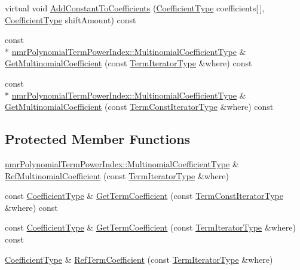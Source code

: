 \begin{DoxyCompactItemize}
\item 
virtual void \hyperlink{classnmr_bernstein_polynomial_a02c6714afc14c2138054e6b27ab8375b}{Add\-Constant\-To\-Coefficients} (\hyperlink{classnmr_polynomial_base_a8693efdfc8585ccb49abea69f74f3eef}{Coefficient\-Type} coefficients\mbox{[}$\,$\mbox{]}, \hyperlink{classnmr_polynomial_base_a8693efdfc8585ccb49abea69f74f3eef}{Coefficient\-Type} shift\-Amount) const 
\item 
const \\*
\hyperlink{classnmr_polynomial_term_power_index_a09f482da776cfb829e26ad1fb381ab94}{nmr\-Polynomial\-Term\-Power\-Index\-::\-Multinomial\-Coefficient\-Type} \& \hyperlink{classnmr_bernstein_polynomial_a934b948b27ef035ef62aa43c635ae784}{Get\-Multinomial\-Coefficient} (const \hyperlink{classnmr_polynomial_container_a276e57445d038e8a16462f47b85719a3}{Term\-Iterator\-Type} \&where) const 
\item 
const \\*
\hyperlink{classnmr_polynomial_term_power_index_a09f482da776cfb829e26ad1fb381ab94}{nmr\-Polynomial\-Term\-Power\-Index\-::\-Multinomial\-Coefficient\-Type} \& \hyperlink{classnmr_bernstein_polynomial_a30b33638e9343cec80cea704f364dde2}{Get\-Multinomial\-Coefficient} (const \hyperlink{classnmr_polynomial_container_aba8d31506ab6a487fdc4fe2815469442}{Term\-Const\-Iterator\-Type} \&where) const 
\end{DoxyCompactItemize}
\subsection*{Protected Member Functions}
\begin{DoxyCompactItemize}
\item 
\hyperlink{classnmr_polynomial_term_power_index_a09f482da776cfb829e26ad1fb381ab94}{nmr\-Polynomial\-Term\-Power\-Index\-::\-Multinomial\-Coefficient\-Type} \& \hyperlink{classnmr_bernstein_polynomial_ab72225000d4462b8ce1c941a29245268}{Ref\-Multinomial\-Coefficient} (const \hyperlink{classnmr_polynomial_container_a276e57445d038e8a16462f47b85719a3}{Term\-Iterator\-Type} \&where)
\item 
const \hyperlink{classnmr_polynomial_base_a8693efdfc8585ccb49abea69f74f3eef}{Coefficient\-Type} \& \hyperlink{classnmr_bernstein_polynomial_ad19aadc8aee129cc1201f638f9340c28}{Get\-Term\-Coefficient} (const \hyperlink{classnmr_polynomial_container_aba8d31506ab6a487fdc4fe2815469442}{Term\-Const\-Iterator\-Type} \&where) const 
\item 
const \hyperlink{classnmr_polynomial_base_a8693efdfc8585ccb49abea69f74f3eef}{Coefficient\-Type} \& \hyperlink{classnmr_bernstein_polynomial_a15e4932f2013e9157706fce26d34d5d0}{Get\-Term\-Coefficient} (const \hyperlink{classnmr_polynomial_container_a276e57445d038e8a16462f47b85719a3}{Term\-Iterator\-Type} \&where) const 
\item 
\hyperlink{classnmr_polynomial_base_a8693efdfc8585ccb49abea69f74f3eef}{Coefficient\-Type} \& \hyperlink{classnmr_bernstein_polynomial_a991fafd8dcb73e118ad9f7a046bc59a5}{Ref\-Term\-Coefficient} (const \hyperlink{classnmr_polynomial_container_a276e57445d038e8a16462f47b85719a3}{Term\-Iterator\-Type} \&where)
\end{DoxyCompactItemize}
